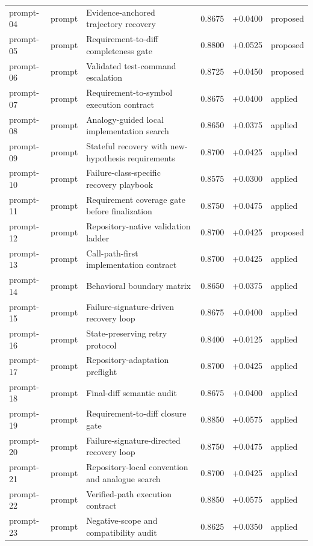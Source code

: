 \begin{center}
\begin{longtable}{llp{5.2cm}rrl}
prompt-04 & prompt & Evidence-anchored trajectory recovery & 0.8675 & +0.0400 & proposed \\
prompt-05 & prompt & Requirement-to-diff completeness gate & 0.8800 & +0.0525 & proposed \\
prompt-06 & prompt & Validated test-command escalation & 0.8725 & +0.0450 & proposed \\
prompt-07 & prompt & Requirement-to-symbol execution contract & 0.8675 & +0.0400 & applied \\
prompt-08 & prompt & Analogy-guided local implementation search & 0.8650 & +0.0375 & applied \\
prompt-09 & prompt & Stateful recovery with new-hypothesis requirements & 0.8700 & +0.0425 & applied \\
prompt-10 & prompt & Failure-class-specific recovery playbook & 0.8575 & +0.0300 & applied \\
prompt-11 & prompt & Requirement coverage gate before finalization & 0.8750 & +0.0475 & applied \\
prompt-12 & prompt & Repository-native validation ladder & 0.8700 & +0.0425 & proposed \\
prompt-13 & prompt & Call-path-first implementation contract & 0.8700 & +0.0425 & applied \\
prompt-14 & prompt & Behavioral boundary matrix & 0.8650 & +0.0375 & applied \\
prompt-15 & prompt & Failure-signature-driven recovery loop & 0.8675 & +0.0400 & applied \\
prompt-16 & prompt & State-preserving retry protocol & 0.8400 & +0.0125 & applied \\
prompt-17 & prompt & Repository-adaptation preflight & 0.8700 & +0.0425 & applied \\
prompt-18 & prompt & Final-diff semantic audit & 0.8675 & +0.0400 & applied \\
prompt-19 & prompt & Requirement-to-diff closure gate & 0.8850 & +0.0575 & applied \\
prompt-20 & prompt & Failure-signature-directed recovery loop & 0.8750 & +0.0475 & applied \\
prompt-21 & prompt & Repository-local convention and analogue search & 0.8700 & +0.0425 & applied \\
prompt-22 & prompt & Verified-path execution contract & 0.8850 & +0.0575 & applied \\
prompt-23 & prompt & Negative-scope and compatibility audit & 0.8625 & +0.0350 & applied \\

\end{longtable}
\end{center}
